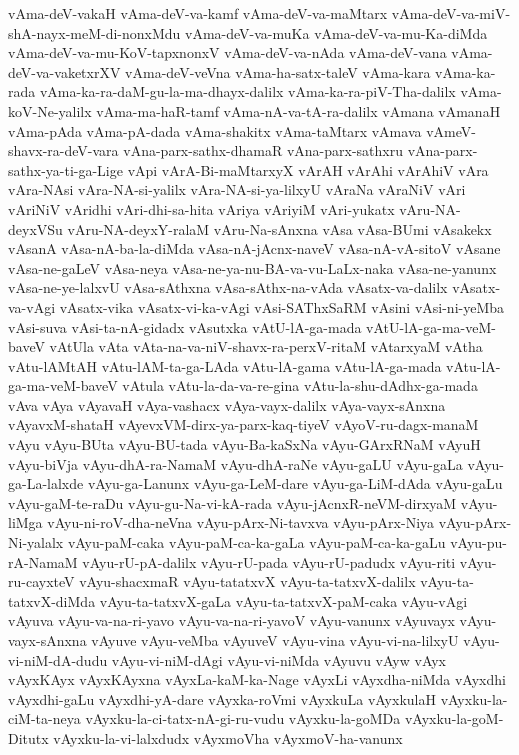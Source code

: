 {vAma-deV-vakaH
vAma-deV-va-kamf
vAma-deV-va-maMtarx
vAma-deV-va-miV-shA-nayx-meM-di-nonxMdu
vAma-deV-va-muKa
vAma-deV-va-mu-Ka-diMda
vAma-deV-va-mu-KoV-tapxnonxV
vAma-deV-va-nAda
vAma-deV-vana
vAma-deV-va-vaketxrXV
vAma-deV-veVna
vAma-ha-satx-taleV
vAma-kara
vAma-ka-rada
vAma-ka-ra-daM-gu-la-ma-dhayx-dalilx
vAma-ka-ra-piV-Tha-dalilx
vAma-koV-Ne-yalilx
vAma-ma-haR-tamf
vAma-nA-va-tA-ra-dalilx
vAmana
vAmanaH
vAma-pAda
vAma-pA-dada
vAma-shakitx
vAma-taMtarx
vAmava
vAmeV-shavx-ra-deV-vara
vAna-parx-sathx-dhamaR
vAna-parx-sathxru
vAna-parx-sathx-ya-ti-ga-Lige
vApi
vArA-Bi-maMtarxyX
vArAH
vArAhi
vArAhiV
vAra
vAra-NAsi
vAra-NA-si-yalilx
vAra-NA-si-ya-lilxyU
vAraNa
vAraNiV
vAri
vAriNiV
vAridhi
vAri-dhi-sa-hita
vAriya
vAriyiM
vAri-yukatx
vAru-NA-deyxVSu
vAru-NA-deyxY-ralaM
vAru-Na-sAnxna
vAsa
vAsa-BUmi
vAsakekx
vAsanA
vAsa-nA-ba-la-diMda
vAsa-nA-jAcnx-naveV
vAsa-nA-vA-sitoV
vAsane
vAsa-ne-gaLeV
vAsa-neya
vAsa-ne-ya-nu-BA-va-vu-LaLx-naka
vAsa-ne-yanunx
vAsa-ne-ye-lalxvU
vAsa-sAthxna
vAsa-sAthx-na-vAda
vAsatx-va-dalilx
vAsatx-va-vAgi
vAsatx-vika
vAsatx-vi-ka-vAgi
vAsi-SAThxSaRM
vAsini
vAsi-ni-yeMba
vAsi-suva
vAsi-ta-nA-gidadx
vAsutxka
vAtU-lA-ga-mada
vAtU-lA-ga-ma-veM-baveV
vAtUla
vAta
vAta-na-va-niV-shavx-ra-perxV-ritaM
vAtarxyaM
vAtha
vAtu-lAMtAH
vAtu-lAM-ta-ga-LAda
vAtu-lA-gama
vAtu-lA-ga-mada
vAtu-lA-ga-ma-veM-baveV
vAtula
vAtu-la-da-va-re-gina
vAtu-la-shu-dAdhx-ga-mada
vAva
vAya
vAyavaH
vAya-vashacx
vAya-vayx-dalilx
vAya-vayx-sAnxna
vAyavxM-shataH
vAyevxVM-dirx-ya-parx-kaq-tiyeV
vAyoV-ru-dagx-manaM
vAyu
vAyu-BUta
vAyu-BU-tada
vAyu-Ba-kaSxNa
vAyu-GArxRNaM
vAyuH
vAyu-biVja
vAyu-dhA-ra-NamaM
vAyu-dhA-raNe
vAyu-gaLU
vAyu-gaLa
vAyu-ga-La-lalxde
vAyu-ga-Lanunx
vAyu-ga-LeM-dare
vAyu-ga-LiM-dAda
vAyu-gaLu
vAyu-gaM-te-raDu
vAyu-gu-Na-vi-kA-rada
vAyu-jAcnxR-neVM-dirxyaM
vAyu-liMga
vAyu-ni-roV-dha-neVna
vAyu-pArx-Ni-tavxva
vAyu-pArx-Niya
vAyu-pArx-Ni-yalalx
vAyu-paM-caka
vAyu-paM-ca-ka-gaLa
vAyu-paM-ca-ka-gaLu
vAyu-pu-rA-NamaM
vAyu-rU-pA-dalilx
vAyu-rU-pada
vAyu-rU-padudx
vAyu-riti
vAyu-ru-cayxteV
vAyu-shacxmaR
vAyu-tatatxvX
vAyu-ta-tatxvX-dalilx
vAyu-ta-tatxvX-diMda
vAyu-ta-tatxvX-gaLa
vAyu-ta-tatxvX-paM-caka
vAyu-vAgi
vAyuva
vAyu-va-na-ri-yavo
vAyu-va-na-ri-yavoV
vAyu-vanunx
vAyuvayx
vAyu-vayx-sAnxna
vAyuve
vAyu-veMba
vAyuveV
vAyu-vina
vAyu-vi-na-lilxyU
vAyu-vi-niM-dA-dudu
vAyu-vi-niM-dAgi
vAyu-vi-niMda
vAyuvu
vAyw
vAyx
vAyxKAyx
vAyxKAyxna
vAyxLa-kaM-ka-Nage
vAyxLi
vAyxdha-niMda
vAyxdhi
vAyxdhi-gaLu
vAyxdhi-yA-dare
vAyxka-roVmi
vAyxkuLa
vAyxkulaH
vAyxku-la-ciM-ta-neya
vAyxku-la-ci-tatx-nA-gi-ru-vudu
vAyxku-la-goMDa
vAyxku-la-goM-Ditutx
vAyxku-la-vi-lalxdudx
vAyxmoVha
vAyxmoV-ha-vanunx
}
